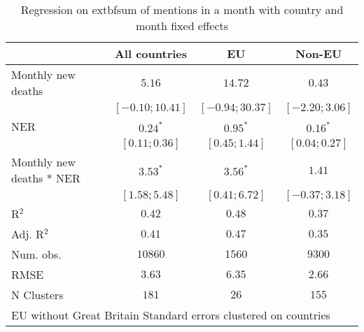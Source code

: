 
\begin{table}
\caption{Regression on 	extbf{sum of mentions} in a month with country and month fixed effects}
\begin{center}
\begin{tabular}{l c c c}
\hline
 & All countries & EU & Non-EU \\
\hline
Monthly new deaths       & $5.16$            & $14.72$           & $0.43$           \\
                         & $ [-0.10; 10.41]$ & $ [-0.94; 30.37]$ & $ [-2.20; 3.06]$ \\
NER                      & $0.24^{*}$        & $0.95^{*}$        & $0.16^{*}$       \\
                         & $ [ 0.11;  0.36]$ & $ [ 0.45;  1.44]$ & $ [ 0.04; 0.27]$ \\
Monthly new deaths * NER & $3.53^{*}$        & $3.56^{*}$        & $1.41$           \\
                         & $ [ 1.58;  5.48]$ & $ [ 0.41;  6.72]$ & $ [-0.37; 3.18]$ \\
\hline
R$^2$                    & $0.42$            & $0.48$            & $0.37$           \\
Adj. R$^2$               & $0.41$            & $0.47$            & $0.35$           \\
Num. obs.                & $10860$           & $1560$            & $9300$           \\
RMSE                     & $3.63$            & $6.35$            & $2.66$           \\
N Clusters               & $181$             & $26$              & $155$            \\
\hline
\multicolumn{4}{l}{\scriptsize{EU without Great Britain
 Standard errors clustered on countries}}
\end{tabular}
\label{table:coefficients}
\end{center}
\end{table}

